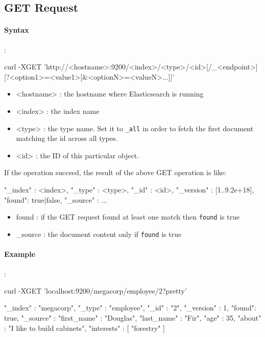 \documentclass{article}%
\begin{document}
\subsection{GET Request}

\paragraph{Syntax}:

\begin{command}
curl -XGET 'http://<hostname>:9200/<index>/<type>/<id>[/_<endpoint>][?<option1>=<value1>[&<optionN>=<valueN>...]]'
\end{command}

\begin{itemize}
	\item <hostname> : the hostname where Elasticsearch is running
	\item <index> : the index name
	\item <type> : the type name. Set it to \texttt{\_all} in order to fetch the first document matching the id across all types.
	\item <id> : the ID of this particular object.
\end{itemize}

If the operation succeed, the result of the above GET operation is like:

\begin{command}
{
	"_index" : <index>,
	"_type" : <type>,
	"_id" : <id>,
	"_version" : [1..9.2e+18],
	"found": true|false,
	"_source" : {
		...
	}
}
\end{command}

\begin{itemize}
	\item found : if the GET request found at least one match then \texttt{found} is true
	\item \_source : the document content only if \texttt{found} is true
\end{itemize}

\paragraph{Example}:

\begin{command}
curl -XGET 'localhost:9200/megacorp/employee/2?pretty'
\end{command}

\begin{command}
{
	"_index" : "megacorp",
	"_type" : "employee",
	"_id" : "2",
	"_version" : 1,
	"found": true,
	"_source" : {
		"first_name" : "Douglas",
		"last_name"  : "Fir",
		"age"        : 35,
		"about"      : "I like to build cabinets",
		"interests"  : [ "forestry" ]
	}
}
\end{command}
\end{document}
